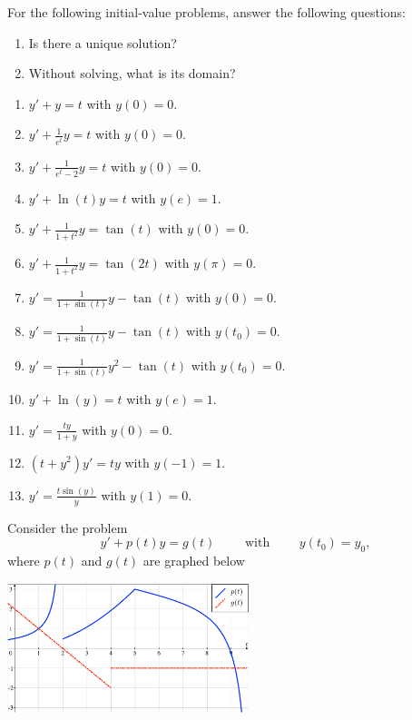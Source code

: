 \begin{exercises}

	\begin{problist}
	\prob For the following initial-value problems, answer the following questions:
		\begin{enumerate}[label=(\roman*)]
		\item Is there a unique solution?
		\item Without solving, what is its domain?
		\end{enumerate}
		
		\begin{enumerate}
			\item $y'+y=t$ with $y(0)=0$.
			\item $\displaystyle y'+\frac{1}{e^t} y = t$ with $y(0)=0$.
			\item $\displaystyle y'+\frac{1}{e^t-2} y = t$ with $y(0)=0$.
			\item $y'+\ln(t)y = t$ with $y(e)=1$.		
			\item $\displaystyle y'+\frac{1}{1+t^2} y = \tan(t)$ with $y(0)=0$.
			\item $\displaystyle y'+\frac{1}{1+t^2} y = \tan(2t)$ with $y(\pi)=0$.
			\item $\displaystyle y'=\frac{1}{1+\sin(t)} y - \tan(t)$ with $y(0)=0$.
			\item $\displaystyle y'=\frac{1}{1+\sin(t)} y - \tan(t)$ with $y(t_0)=0$.
			\item $\displaystyle y'=\frac{1}{1+\sin(t)} y^2 - \tan(t)$ with $y(t_0)=0$.
			\item $y'+\ln(y) = t$ with $y(e)=1$.		
			\item $\displaystyle y'=\frac{ty}{1+y}$ with $y(0)=0$.
			\item $(t+y^2)y'=ty$ with $y(-1)=1$.
			\item $\displaystyle y'=\frac{t\sin(y)}{y}$ with $y(1)=0$.
		\end{enumerate}


	
	
	\prob Consider the problem
		$$
		y' + p(t) y = g(t) \qquad \text{ with } \qquad y(t_0)=y_0,
		$$
		where $p(t)$ and $g(t)$ are graphed below
		\begin{center}
		\includegraphics*[width=200pt]{images/module13-pg_graph.pdf}
		\end{center}
		

\end{problist}
\end{exercises}
